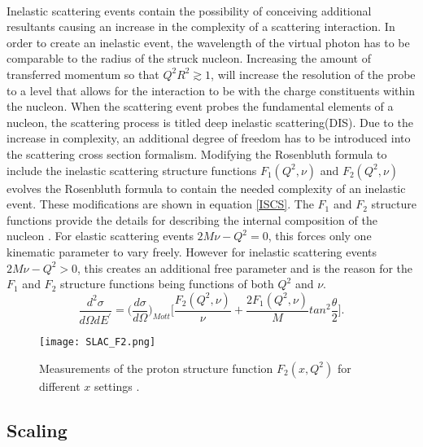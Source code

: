 \paragraph{}Inelastic scattering events contain the possibility of conceiving additional resultants causing an increase in the complexity of a scattering interaction. In order to create an inelastic event, the wavelength of the virtual photon has to be comparable to the radius of the struck nucleon. Increasing the amount of transferred momentum so that $Q^2R^2 \gtrsim 1$, will increase the resolution of the probe to a level that allows for the interaction to be with the charge constituents within the nucleon. When the scattering event probes the fundamental elements of a nucleon, the scattering process is titled deep inelastic scattering(DIS). Due to the increase in complexity, an additional degree of freedom has to be introduced into the scattering cross section formalism. Modifying the Rosenbluth formula to include the inelastic scattering structure functions $F_1(Q^2,\nu)$ and $F_2(Q^2,\nu)$ evolves the Rosenbluth formula to contain the needed complexity of an inelastic event. These modifications are shown in equation \ref{ISCS}. The $F_1$ and $F_2$ structure functions provide the details for describing the internal composition of the nucleon \cite{PnN}. For elastic scattering events $2M\nu - Q^2 = 0$, this forces only one kinematic parameter to vary freely. However for inelastic scattering events $2M\nu - Q^2 > 0$, this creates an additional free parameter and is the reason for the  $F_1$ and $F_2$ structure functions being functions of both $Q^2$ and $\nu$.
\begin{equation}
\label{ISCS}
\frac{d^2\sigma}{d\Omega dE^\prime}=\bigg(\frac{d\sigma}{d\Omega}\bigg)_{Mott} \bigg\lbrack \frac{F_2(Q^2,\nu)}{\nu} + \frac{2F_1(Q^2,\nu)}{M}tan^2\frac{\theta}{2} \bigg \rbrack.
\end{equation}  
\begin{figure}[t]
	\centering
	\texttt{[image: SLAC\_F2.png]} 
	\caption{ Measurements of the proton structure function $F_2(x, Q^2)$ for different $x$ settings\cite{ref:rev_pp} .}
	\label{F2_fig}
\end{figure} 
\subsection{Scaling}
